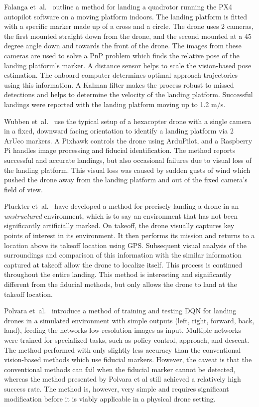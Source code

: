 Falanga et~al.~\cite{vision_based_x_platform} outline a method for landing a quadrotor running the PX4 autopilot software on a moving platform indoors. The landing platform is fitted with a specific marker made up of a cross and a circle. The drone uses 2 cameras, the first mounted straight down from the drone, and the second mounted at a 45 degree angle down and towards the front of the drone. The images from these cameras are used to solve a  {PnP} problem which finds the relative pose of the landing platform's marker. A distance sensor helps to scale the vision-based pose estimation. The onboard computer determines optimal approach trajectories using this information. A Kalman filter makes the process robust to missed detections and helps to determine the velocity of the landing platform. Successful landings were reported with the landing platform moving up to 1.2 m/s.

Wubben et~al.~\cite{accurate_landing_UAV_ground_pattern} use the typical setup of a hexacopter drone with a single camera in a fixed, downward facing orientation to identify a landing platform via 2 ArUco markers. A Pixhawk controls the drone using ArduPilot, and a Raspberry Pi handles image processing and fiducial identification. The method reports successful and accurate landings, but also occasional failures due to visual loss of the landing platform. This visual loss was caused by sudden gusts of wind which pushed the drone away from the landing platform and out of the fixed camera's field of view.

Pluckter et~al.~\cite{drone_landing_unstructured_environments} have developed a method for precisely landing a drone in an \textit{unstructured} environment, which is to say an environment that has not been significantly artificially marked. On takeoff, the drone visually captures key points of interest in its environment. It then performs its mission and returns to a location above its takeoff location using  {GPS}. Subsequent visual analysis of the surroundings and comparison of this information with the similar information captured at takeoff allow the drone to localize itself. This process is continued throughout the entire landing. This method is interesting and significantly different from the fiducial methods, but only allows the drone to land at the takeoff location.

Polvara et~al.~\cite{drq_landing} introduce a method of training and testing  {DQN} for landing drones in a simulated environment with simple outputs (left, right, forward, back, land), feeding the networks low-resolution images as input. Multiple networks were trained for specialized tasks, such as policy control, approach, and descent. The method performed with only slightly less accuracy than the conventional vision-based methods which use fiducial markers. However, the caveat is that the conventional methods can fail when the fiducial marker cannot be detected, whereas the method presented by Polvara et al still achieved a relatively high success rate. The method is, however, very simple and requires significant modification before it is viably applicable in a physical drone setting.

